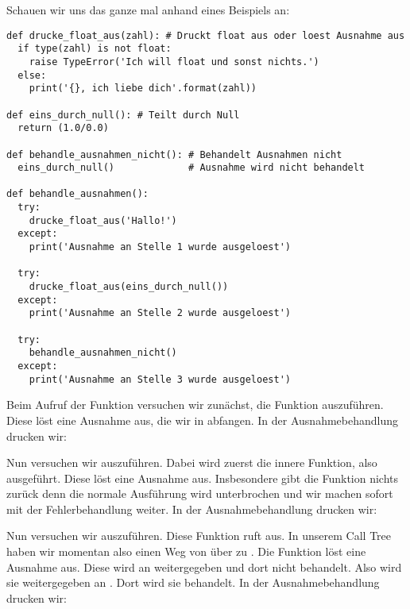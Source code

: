Schauen wir uns das ganze mal anhand eines Beispiels an:
\begin{lstlisting}
def drucke_float_aus(zahl): # Druckt float aus oder loest Ausnahme aus
  if type(zahl) is not float:
    raise TypeError('Ich will float und sonst nichts.')
  else:
    print('{}, ich liebe dich'.format(zahl))

def eins_durch_null(): # Teilt durch Null
  return (1.0/0.0)

def behandle_ausnahmen_nicht(): # Behandelt Ausnahmen nicht
  eins_durch_null()             # Ausnahme wird nicht behandelt

def behandle_ausnahmen():
  try:
    drucke_float_aus('Hallo!')
  except:
    print('Ausnahme an Stelle 1 wurde ausgeloest')
  
  try:
    drucke_float_aus(eins_durch_null())
  except:
    print('Ausnahme an Stelle 2 wurde ausgeloest')
  
  try:
    behandle_ausnahmen_nicht()
  except:
    print('Ausnahme an Stelle 3 wurde ausgeloest')
\end{lstlisting}
Beim Aufruf der Funktion  versuchen wir zunächst, die Funktion  auszuführen.
Diese löst eine Ausnahme aus, die wir in  abfangen.
In der Ausnahmebehandlung drucken wir:
\begin{center}
\end{center}
Nun versuchen wir  auszuführen.
Dabei wird zuerst die innere Funktion, also  ausgeführt.
Diese löst eine Ausnahme aus.
Insbesondere gibt die Funktion  nichts zurück denn die normale Ausführung wird unterbrochen und wir machen sofort mit der Fehlerbehandlung weiter.
In der Ausnahmebehandlung drucken wir:
\begin{center}
\end{center}
Nun versuchen wir  auszuführen.
Diese Funktion ruft  aus.
In unserem Call Tree haben wir momentan also einen Weg von  über  zu .
Die Funktion  löst eine Ausnahme aus.
Diese wird an  weitergegeben und dort nicht behandelt.
Also wird sie weitergegeben an .
Dort wird sie behandelt.
In der Ausnahmebehandlung drucken wir:
\begin{center}
\end{center}
